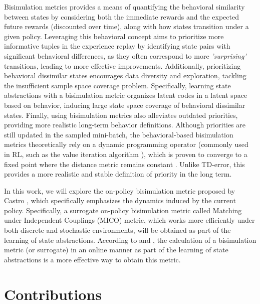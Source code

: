 Bisimulation metrics \cite{ferns2004metrics, ferns2011bisimulation, ferns2014bisimulation, castro2020scalable} provides a means of quantifying the behavioral similarity between states by considering both the immediate rewards and the expected future rewards (discounted over time), along with how states transition under a given policy. Leveraging this behavioral concept aims to prioritize more informative tuples in the experience replay by identifying state pairs with significant behavioral differences, as they often correspond to more \textit{'surprising'} transitions, leading to more effective improvements. Additionally, prioritizing behavioral dissimilar states encourages data diversity and exploration, tackling the insufficient sample space coverage problem. Specifically, learning state abstractions with a bisimulation metric organizes latent codes in a latent space based on behavior, inducing large state space coverage of behavioral dissimilar states. Finally, using bisimulation metrics also alleviates outdated priorities, providing more realistic long-term behavior definitions. Although priorities are still updated in the sampled mini-batch, the behavioral-based bisimulation metrics theoretically rely on a dynamic programming operator (commonly used in RL, such as the value iteration algorithm \cite{sutton2018reinforcement}), which is proven to converge to a fixed point where the distance metric remains constant \cite{castro2020scalable, castro2021mico}. Unlike TD-error, this provides a more realistic and stable definition of priority in the long term.

In this work, we will explore the on-policy bisimulation metric proposed by Castro \cite{castro2020scalable}, which specifically emphasizes the dynamics induced by the current policy. Specifically, a surrogate on-policy bisimulation metric called Matching under Independent Couplings (MICO) \cite{castro2021mico} metric, which works more efficiently under both discrete and stochastic environments, will be obtained as part of the learning of state abstractions. According to \cite{zhang2020learning} and \cite{castro2021mico}, the calculation of a bisimulation metric (or surrogate) in an online manner as part of the learning of state abstractions is a more effective way to obtain this metric.

\section{Contributions}

